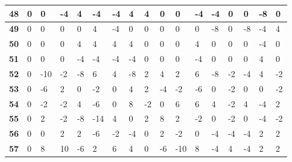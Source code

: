 \begin{longtable}[c]{|l|l|l|l|l|l|l|l|l|l|l|l|l|l|l|l|l|}
\textbf{48} & 0          & 0          & -4         & 4          & -4         & -4         & 4          & 4          & 0          & 0          & -4          & -4           & 0           & 0           & -8          & 0            \\ \hline
\textbf{49} & 0          & 0          & 0          & 0          & 4          & -4         & 0          & 0          & 0          & 0          & 0           & -8           & 0           & -8          & -4          & 4            \\ \hline
\textbf{50} & 0          & 0          & 0          & 4          & 4          & 4          & 4          & 0          & 0          & 0          & 4           & 0            & 0           & 0           & -4          & 0            \\ \hline
\textbf{51} & 0          & 0          & 0          & -4         & -4         & -4         & -4         & 0          & 0          & 0          & -4          & 0            & 0           & 0           & 4           & 0            \\ \hline
\textbf{52} & 0          & -10        & -2         & -8         & 6          & 4          & -8         & 2          & 4          & 2          & 6           & -8           & -2          & -4          & 4           & -2           \\ \hline
\textbf{53} & 0          & -6         & 2          & 0          & -2         & 0          & 4          & 2          & -4         & -2         & -6          & 0            & -2          & 0           & 0           & -2           \\ \hline
\textbf{54} & 0          & -2         & -2         & 4          & -6         & 0          & 8          & -2         & 0          & 6          & 6           & 4            & -2          & 4           & -4          & 2            \\ \hline
\textbf{55} & 0          & 2          & -2         & -8         & -14        & 4          & 0          & 2          & 8          & 2          & -2          & 0            & -2          & 0           & -4          & -2           \\ \hline
\textbf{56} & 0          & 0          & 2          & 2          & -6         & -2         & -4         & 0          & 2          & -2         & 0           & -4           & -4          & -4          & 2           & 2            \\ \hline
\textbf{57} & 0          & 8          & 10         & -6         & 2          & 6          & 4          & 0          & -6         & -10        & 8           & -4           & 4           & -4          & 2           & 2            \\ \hline

\end{longtable}

